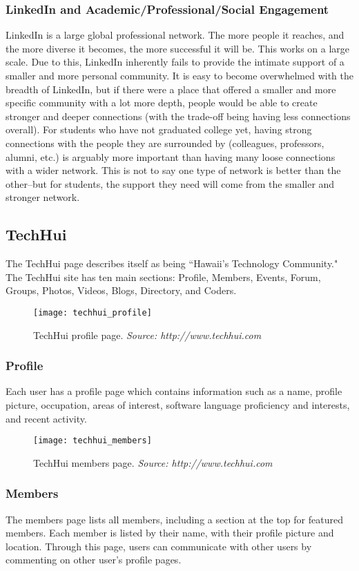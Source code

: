 \subsubsection{LinkedIn and Academic/Professional/Social Engagement}
LinkedIn is a large global professional network. The more people it reaches, and the more diverse it becomes, the more successful it will be. This works on a large scale. Due to this, LinkedIn inherently fails to provide the intimate support of a smaller and more personal community. It is easy to become overwhelmed with the breadth of LinkedIn, but if there were a place that offered a smaller and more specific community with a lot more depth, people would be able to create stronger and deeper connections (with the trade-off being having less connections overall). For students who have not graduated college yet, having strong connections with the people they are surrounded by (colleagues, professors, alumni, etc.) is arguably more important than having many loose connections with a wider network. This is not to say one type of network is better than the other--but for students, the support they need will come from the smaller and stronger network. 

\subsection{TechHui}
The TechHui page describes itself as being ``Hawaii's Technology Community." The TechHui site has ten main sections: Profile, Members, Events, Forum, Groups, Photos, Videos, Blogs, Directory, and Coders.

\begin{figure}[h]
\centering
\texttt{[image: techhui\_profile]}
\caption{TechHui profile page. \textit{Source: http://www.techhui.com}}
\end{figure}
\subsubsection{Profile}
Each user has a profile page which contains information such as a name, profile picture, occupation, areas of interest, software language proficiency and interests, and recent activity.

\begin{figure}[h]
\centering
\texttt{[image: techhui\_members]}
\caption{TechHui members page. \textit{Source: http://www.techhui.com}}
\end{figure}
\subsubsection{Members}
The members page lists all members, including a section at the top for featured members. Each member is listed by their name, with their profile picture and location. Through this page, users can communicate with other users by commenting on other user's profile pages.

